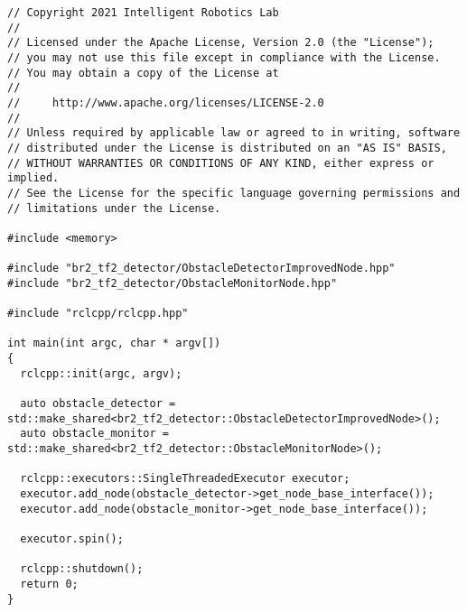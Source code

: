  \footnotesize
\begin{tcolorbox}[sharp corners, colframe=gray!80, colback=LightGray, left=0pt, top=0pt, bottom=0pt, title=\texttt{br2\_tf2\_detector/src/detector\_improved\_main.cpp}]
  \begin{verbatim}
// Copyright 2021 Intelligent Robotics Lab
//
// Licensed under the Apache License, Version 2.0 (the "License");
// you may not use this file except in compliance with the License.
// You may obtain a copy of the License at
//
//     http://www.apache.org/licenses/LICENSE-2.0
//
// Unless required by applicable law or agreed to in writing, software
// distributed under the License is distributed on an "AS IS" BASIS,
// WITHOUT WARRANTIES OR CONDITIONS OF ANY KIND, either express or implied.
// See the License for the specific language governing permissions and
// limitations under the License.

#include <memory>

#include "br2_tf2_detector/ObstacleDetectorImprovedNode.hpp"
#include "br2_tf2_detector/ObstacleMonitorNode.hpp"

#include "rclcpp/rclcpp.hpp"

int main(int argc, char * argv[])
{
  rclcpp::init(argc, argv);

  auto obstacle_detector = std::make_shared<br2_tf2_detector::ObstacleDetectorImprovedNode>();
  auto obstacle_monitor = std::make_shared<br2_tf2_detector::ObstacleMonitorNode>();

  rclcpp::executors::SingleThreadedExecutor executor;
  executor.add_node(obstacle_detector->get_node_base_interface());
  executor.add_node(obstacle_monitor->get_node_base_interface());

  executor.spin();

  rclcpp::shutdown();
  return 0;
}
    \end{verbatim}
    \end{tcolorbox}
  \normalsize

